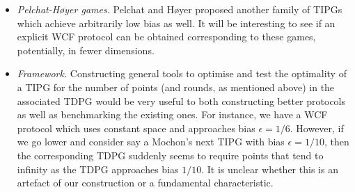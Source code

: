 \documentclass{article}
\begin{document}
\begin{itemize}
  \item \emph{Pelchat-Høyer games.}  Pelchat and  Høyer \cite{pelchat13} proposed another family of TIPGs which achieve arbitrarily low bias as well. It will be interesting to see if an explicit WCF protocol can be obtained corresponding to these games, potentially, in fewer dimensions.
  \item \emph{Framework.} Constructing general tools to optimise and test the
        optimality of a TIPG for the number of points (and rounds, as mentioned above)
        in the associated TDPG would be very useful to both constructing better
        protocols as well as benchmarking the existing ones. For instance, we have a WCF protocol which uses constant space and approaches bias $\epsilon=1/6$. However, if we go lower and consider say a Mochon's next TIPG with bias $\epsilon=1/10$, then the corresponding TDPG suddenly seems to require points that tend to infinity as the TDPG approaches bias $1/10$. It is unclear whether this is an artefact of our construction or a fundamental characteristic.
\end{itemize}
\end{document}
